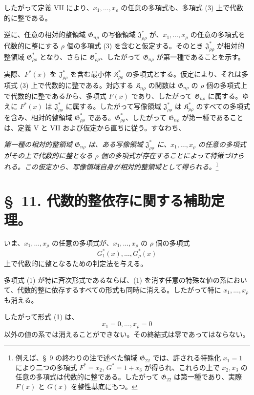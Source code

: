 \documentclass[11pt]{jlreq}
\providecommand{\Kfield}{\mathfrak{K}}
\providecommand{\Jdom}{\mathfrak{J}}
\providecommand{\Gdom}{\mathfrak{G}}
\begin{document}
したがって定義 VII により、$x_1,\ldots,x_\rho$ の任意の多項式も、多項式 (3) 上で代数的に整である。

逆に、任意の相対的整領域 $\Gdom_{n\rho}$ の写像領域 $\Jdom^*_{\rho\rho}$ が、$x_1,\ldots,x_\rho$ の任意の多項式を代数的に整にする $\rho$ 個の多項式 (3) を含むと仮定する。そのとき $\Jdom^*_{\rho\rho}$ が相対的整領域 $\Gdom^*_{\rho\rho}$ となり、さらに $\Gdom^*_{\rho\rho}$、したがって $\Gdom_{n\rho}$ が第一種であることを示す。

実際、$F^*(x)$ を $\Jdom^*_{\rho\rho}$ を含む最小体 $\Kfield^*_{\rho\rho}$ の多項式とする。仮定により、それは多項式 (3) 上で代数的に整である。対応する $\Kfield_{n\rho}$ の関数は $\Gdom_{n\rho}$ の $\rho$ 個の多項式上で代数的に整であるから、多項式 $F(x)$ であり、したがって $\Gdom_{n\rho}$ に属する。ゆえに $F^*(x)$ は $\Jdom^*_{\rho\rho}$ に属する。したがって写像領域 $\Jdom^*_{\rho\rho}$ は $\Kfield^*_{\rho\rho}$ のすべての多項式を含み、相対的整領域 $\Gdom^*_{\rho\rho}$ である。$\Gdom^*_{\rho\rho}$、したがって $\Gdom_{n\rho}$ が第一種であることは、定義 V と VII および仮定から直ちに従う。すなわち、

\emph{第一種の相対的整領域 $\Gdom_{n\rho}$ は、ある写像領域 $\Jdom^*_{\rho\rho}$ に、$x_1,\ldots,x_\rho$ の任意の多項式がその上で代数的に整となる $\rho$ 個の多項式が存在することによって特徴づけられる。この仮定から、写像領域自身が相対的整領域として得られる。}\footnote{例えば、\S\ 9 の終わりの注で述べた領域 $\Gdom_{22}$ では、許される特殊化 $x_1=1$ により二つの多項式 $F^*=x_2$, $G^*=1+x_3$ が得られ、これらの上で $x_2,x_3$ の任意の多項式は代数的に整である。したがって $\Gdom_{22}$ は第一種であり、実際 $F(x)$ と $G(x)$ を整性基底にもつ。}

\section*{\S\ 11. 代数的整依存に関する補助定理。}

いま、$x_1,\ldots,x_\rho$ の任意の多項式が、$x_1,\ldots,x_\rho$ の $\rho$ 個の多項式
\begin{equation}
  G_1^*(x),\ldots,G_\rho^*(x)
\tag{1}
\end{equation}
上で代数的に整となるための判定法を与える。

多項式 (1) が特に斉次形式であるならば、(1) を消す任意の特殊な値の系において、代数的整に依存するすべての形式も同時に消える。したがって特に $x_1,\ldots,x_\rho$ も消える。

したがって形式 (1) は、
\[
  x_1=0,
  \ldots,
  x_\rho=0
\]
以外の値の系では消えることができない。その終結式は零であってはならない。
\end{document}
